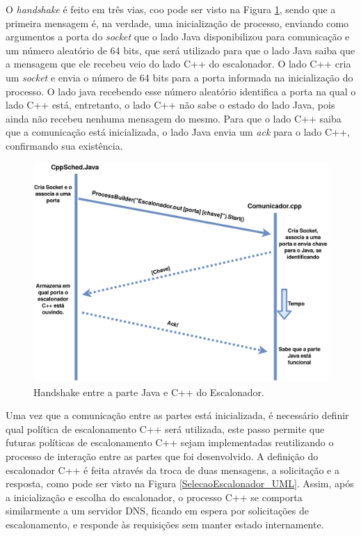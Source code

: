 O \textit{handshake} é feito em três vias, coo pode ser visto na Figura \ref{Handshake_UML}, sendo que a primeira mensagem é, na verdade, uma inicialização de processo, enviando como argumentos a porta do \textit{socket} que o lado Java disponibilizou para comunicação e um número aleatório de 64 bits, que será utilizado para que o lado Java saiba que a mensagem que ele recebeu veio do lado C++ do escalonador. O lado C++ cria um \textit{socket} e envia o número de 64 bits para a porta informada na inicialização do processo. O lado java recebendo esse número aleatório identifica a porta na qual o lado C++ está, entretanto, o lado C++ não sabe o estado do lado Java, pois ainda não recebeu nenhuma mensagem do mesmo. Para que o lado C++ saiba que a comunicação está inicializada, o lado Java envia um \textit{ack} para o lado C++, confirmando sua existência.

\begin{figure}[htbp]
	\centerline{\includegraphics[width=13cm]{img/InicializacaoDoEscalonador.png}}
	\caption{Handshake entre a parte Java e C++ do Escalonador.}
	\label{Handshake_UML}
\end{figure}

Uma vez que a comunicação entre as partes está inicializada, é necessário definir qual política de escalonamento C++ será utilizada, este passo permite que futuras políticas de escalonamento C++ sejam implementadas reutilizando o processo de interação entre as partes que foi desenvolvido. A definição do escalonador C++ é feita através da troca de duas mensagens, a solicitação e a resposta, como pode ser visto na Figura \ref{SelecaoEscalonador_UML}. Assim, após a inicialização e escolha do escalonador, o processo C++ se comporta similarmente a um servidor \acrshort{DNS}\cite{dns_rfc}, ficando em espera por solicitações de escalonamento, e responde às requisições sem manter estado internamente.

